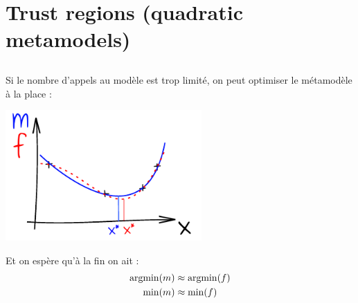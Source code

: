 \documentclass{beamer}
\newcommand{\argmin}{\operatornamewithlimits{argmin}}
\begin{document}
\section[Trust regions]{Trust regions (quadratic metamodels)}
\subsection{}

\begin{frame}{}
Si le nombre d'appels au modèle est trop limité, on peut optimiser le métamodèle à la place :

\begin{center}
\includegraphics[height=5cm]{figures/ink_mf}
\end{center}
Et on espère qu'à la fin on ait :
\begin{equation*}
	\begin{split}
		\argmin(m) & \approx \argmin(f)\\
		\min(m) & \approx \min(f)\\
	\end{split}
\end{equation*}
\end{frame}
\end{document}
